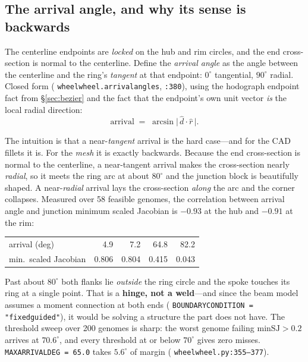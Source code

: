 \documentclass[11pt,a4paper]{article}
\DeclareRobustCommand{\code}[1]{%
  \texttt{\small\def\_{\textunderscore\discretionary{}{}{}}#1}}
\newcommand{\at}[2]{\code{#1:#2}}
\begin{document}
\subsection{The arrival angle, and why its sense is backwards}
\label{sec:arrival}

The centerline endpoints are \emph{locked} on the hub and rim circles, and the end
cross-section is normal to the centerline. Define the \emph{arrival angle} as the angle
between the centerline and the ring's \emph{tangent} at that endpoint: $0^\circ$
tangential, $90^\circ$ radial. Closed form
(\code{wheel\_wheel.arrival\_angles}, \code{:380}), using the hodograph endpoint fact
from \S\ref{sec:bezier} and the fact that the endpoint's own unit vector \emph{is} the
local radial direction:
%
\begin{equation}
  \mathrm{arrival} \;=\; \arcsin\bigl|\,\hat d \cdot \hat r\,\bigr|.
\end{equation}

The intuition is that a near-\emph{tangent} arrival is the hard case---and for the CAD
fillets it is. For the \emph{mesh} it is exactly backwards. Because the end
cross-section is normal to the centerline, a near-tangent arrival makes the
cross-section nearly \emph{radial}, so it meets the ring arc at about $80^\circ$ and
the junction block is beautifully shaped. A near-\emph{radial} arrival lays the
cross-section \emph{along} the arc and the corner collapses. Measured over 58 feasible
genomes, the correlation between arrival angle and junction minimum scaled Jacobian is
$-0.93$ at the hub and $-0.91$ at the rim:

\begin{table}[h]
\centering
\small
\begin{tabular}{@{}lrrrr@{}}
\toprule
arrival (deg) & 4.9 & 7.2 & 64.8 & 82.2 \\
min.\ scaled Jacobian & 0.806 & 0.804 & 0.415 & 0.043 \\
\bottomrule
\end{tabular}
\end{table}

Past about $80^\circ$ both flanks lie \emph{outside} the ring circle and the spoke
touches its ring at a single point. That is a \textbf{hinge, not a weld}---and since
the beam model assumes a moment connection at both ends
(\code{BOUNDARY\_CONDITION = "fixed\_guided"}), it would be solving a structure the part
does not have. The threshold sweep over 200 genomes is sharp: the worst genome failing
$\mathrm{minSJ} > 0.2$ arrives at $70.6^\circ$, and every threshold at or below
$70^\circ$ gives zero misses. \code{MAX\_ARRIVAL\_DEG = 65.0} takes $5.6^\circ$ of
margin (\at{wheel\_wheel.py}{355--377}).
\end{document}
